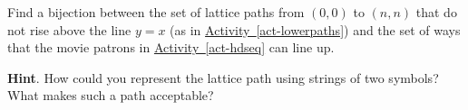 \documentclass{book}
\begin{document}
\setcounter{cpjt}{178}
\addtocounter{cpjt}{-1}
\begin{activity}\label{act-pathshdseq}
\hypertarget{p-1008}{}%
Find a bijection between the set of lattice paths from \((0,0)\) to \((n,n)\) that do not rise above the line \(y = x\) (as in \hyperref[act-lowerpaths]{Activity~\ref{act-lowerpaths}}) and the set of ways that the movie patrons in \hyperref[act-hdseq]{Activity~\ref{act-hdseq}} can line up.%
\par\smallskip%
\noindent\textbf{Hint}.\hypertarget{hint-117}{}\quad%
\hypertarget{p-1009}{}%
How could you represent the lattice path using strings of two symbols?  What makes such a path acceptable?%
\end{activity}

\clearpage
\end{document}
